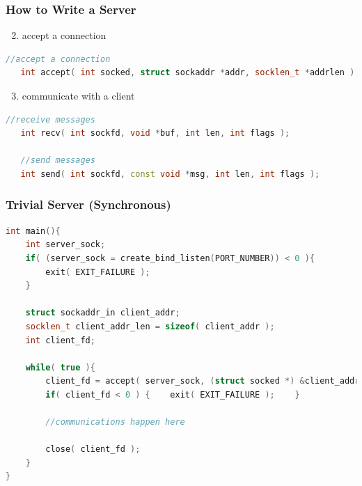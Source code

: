 \documentclass[aspectratio=43]{beamer}
\begin{document}
\begin{frame}[fragile]
  \frametitle{How to Write a Server}

   \begin{enumerate}
   \setcounter{enumi}{1}
   \item accept a connection
    \end{enumerate}
    \begin{lstlisting}[language=C++,basicstyle=\ttfamily\footnotesize,commentstyle=\color{commgreen},keywordstyle=\color{blue},breaklines=true]
   //accept a connection
   int accept( int socked, struct sockaddr *addr, socklen_t *addrlen );
   \end{lstlisting}
   
   \begin{enumerate}
   \setcounter{enumi}{2}
   \item communicate with a client
   \end{enumerate}
   
   \begin{lstlisting}[language=C++,basicstyle=\ttfamily\footnotesize,commentstyle=\color{commgreen},keywordstyle=\color{blue},breaklines=true]
   //receive messages
   int recv( int sockfd, void *buf, int len, int flags );
   
   //send messages
   int send( int sockfd, const void *msg, int len, int flags );
   \end{lstlisting}
\end{frame}

\begin{frame}[fragile]
  \frametitle{Trivial Server (Synchronous)}

\begin{lstlisting}[language=C++,basicstyle=\ttfamily\footnotesize,commentstyle=\color{commgreen},keywordstyle=\color{blue},breaklines=true]
int main(){
    int server_sock;
    if( (server_sock = create_bind_listen(PORT_NUMBER)) < 0 ){
        exit( EXIT_FAILURE );
    }
    
    struct sockaddr_in client_addr;
    socklen_t client_addr_len = sizeof( client_addr );
    int client_fd;
    
    while( true ){
        client_fd = accept( server_sock, (struct socked *) &client_addr, &client_addr_len );
        if( client_fd < 0 ) {    exit( EXIT_FAILURE );    }
        
        //communications happen here
        
        close( client_fd );
    }
}
   \end{lstlisting}
\end{frame}
\end{document}

